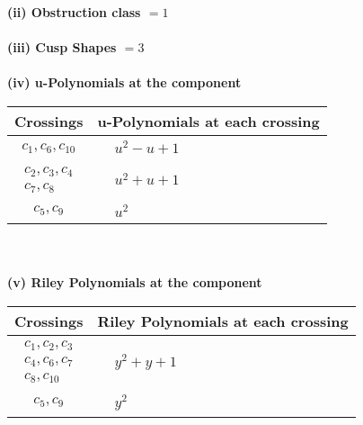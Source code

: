 \documentclass[1p]{elsarticle_modified}
\theoremstyle{definition}
\begin{document}
\flushleft \textbf{(ii) Obstruction class $= 1$}\\~\\
\flushleft \textbf{(iii) Cusp Shapes $= 3$}\\~\\
\newpage\renewcommand{\arraystretch}{1}
\flushleft \textbf{(iv) u-Polynomials at the component}\newline \\
\begin{tabular}{m{50pt}|m{274pt}}
Crossings & \hspace{64pt}u-Polynomials at each crossing \\
\hline $$\begin{aligned}c_{1},c_{6},c_{10}\end{aligned}$$&$\begin{aligned}
&u^2- u+1
\end{aligned}$\\
\hline $$\begin{aligned}c_{2},c_{3},c_{4}\\c_{7},c_{8}\end{aligned}$$&$\begin{aligned}
&u^2+u+1
\end{aligned}$\\
\hline $$\begin{aligned}c_{5},c_{9}\end{aligned}$$&$\begin{aligned}
&u^2
\end{aligned}$\\
\hline
\end{tabular}\\~\\
\newpage\renewcommand{\arraystretch}{1}
\flushleft \textbf{(v) Riley Polynomials at the component}\newline \\
\begin{tabular}{m{50pt}|m{274pt}}
Crossings & \hspace{64pt}Riley Polynomials at each crossing \\
\hline $$\begin{aligned}c_{1},c_{2},c_{3}\\c_{4},c_{6},c_{7}\\c_{8},c_{10}\end{aligned}$$&$\begin{aligned}
&y^2+y+1
\end{aligned}$\\
\hline $$\begin{aligned}c_{5},c_{9}\end{aligned}$$&$\begin{aligned}
&y^2
\end{aligned}$\\
\hline
\end{tabular}\\~\\
\end{document}
